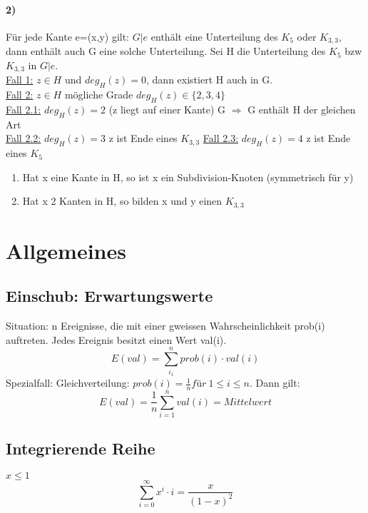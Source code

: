 \paragraph{2)} Für jede Kante e=(x,y) gilt: $ G|e $ enthält eine Unterteilung des $ K_5 $ oder $ K_{3,3} $, dann enthält auch G eine solche Unterteilung. Sei H die Unterteilung des $ K_5 $ bzw $ K_{3,3} $ in $ G|e $.\\
\underline{Fall 1:} $ z \in H $ und $ deg_H(z)=0 $, dann existiert H auch in G. \\
\underline{Fall 2:} $ z \in H$ mögliche Grade  $ deg_H(z) \in \{2, 3, 4 \} $ \\
\underline{Fall 2.1:} $ deg_H(z) = 2 $ (z liegt auf einer Kante) G $ \Rightarrow $ G enthält H der gleichen Art \\
\underline{Fall 2.2:} $ deg_H(z) = 3 $ z ist Ende eines $ K_{3,3} $
\underline{Fall 2.3:} $ deg_H(z) = 4 $ z ist Ende eines $ K_{5} $
\begin{enumerate}
    \item Hat x eine Kante in H, so ist x ein Subdivision-Knoten (symmetrisch für y)
    \item Hat x 2 Kanten in H, so bilden x und y einen $ K_{3,3} $
\end{enumerate}



\section{Allgemeines}
\subsection{Einschub: Erwartungswerte}
Situation: n Ereignisse, die mit einer gweissen Wahrscheinlichkeit prob(i) auftreten. Jedes Ereignis besitzt einen Wert val(i). 
$$E(val) = \sum_{i_1}^{n} prob(i)\cdot val(i) $$
Spezialfall: Gleichverteilung: $ prob(i)=\frac{1}{n} für\ 1\leq i \leq n $. Dann gilt:
$$ E(val)= \frac{1}{n} \sum_{i=1}^{n}val(i) = Mittelwert $$

\subsection{Integrierende Reihe}
$ x \leq 1 $
$$ \sum_{i=0}^\infty x^i \cdot i = \frac{x}{(1-x)^2}$$



